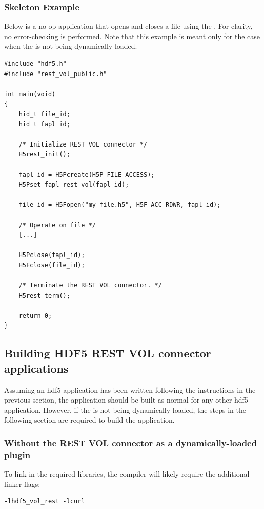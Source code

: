 \documentclass[../users_guide.tex]{subfiles}
\begin{document}
\subsubsection{Skeleton Example}

Below is a no-op application that opens and closes a file using the \rvc{}.
For clarity, no error-checking is performed. Note that this example is
meant only for the case when the \rvc{} is not being dynamically loaded.

\begin{verbatim}
#include "hdf5.h"
#include "rest_vol_public.h"

int main(void)
{
    hid_t file_id;
    hid_t fapl_id;

    /* Initialize REST VOL connector */
    H5rest_init();

    fapl_id = H5Pcreate(H5P_FILE_ACCESS);
    H5Pset_fapl_rest_vol(fapl_id); 

    file_id = H5Fopen("my_file.h5", H5F_ACC_RDWR, fapl_id);

    /* Operate on file */
    [...]

    H5Pclose(fapl_id);
    H5Fclose(file_id);

    /* Terminate the REST VOL connector. */
    H5rest_term();

    return 0;
}
\end{verbatim}

\subsection{Building HDF5 REST VOL connector applications}

Assuming an \acrshort{hdf5} application has been written following the instructions in the previous
section, the application should be built as normal for any other \acrshort{hdf5} application. However,
if the \rvc{} is not being dynamically loaded, the steps in the following section are required to
build the application.

\subsubsection{Without the REST VOL connector as a dynamically-loaded plugin}

To link in the required libraries, the compiler will likely require the
additional linker flags:

\begin{verbatim}
-lhdf5_vol_rest -lcurl
\end{verbatim}
\end{document}
